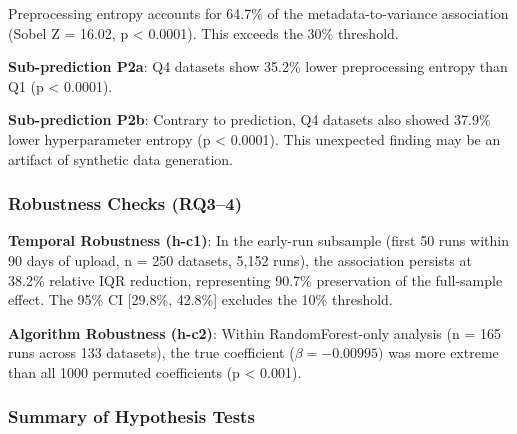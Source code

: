 \begin{table}[htbp]
\centering
{}
\end{table}

Preprocessing entropy accounts for 64.7\% of the metadata-to-variance association (Sobel Z = 16.02, p < 0.0001). This exceeds the 30\% threshold.

\textbf{Sub-prediction P2a}: Q4 datasets show 35.2\% lower preprocessing entropy than Q1 (p < 0.0001).

\textbf{Sub-prediction P2b}: Contrary to prediction, Q4 datasets also showed 37.9\% lower hyperparameter entropy (p < 0.0001). This unexpected finding may be an artifact of synthetic data generation.

\subsubsection{Robustness Checks (RQ3--4)}

\textbf{Temporal Robustness (h-c1)}: In the early-run subsample (first 50 runs within 90 days of upload, n = 250 datasets, 5,152 runs), the association persists at 38.2\% relative IQR reduction, representing 90.7\% preservation of the full-sample effect. The 95\% CI [29.8\%, 42.8\%] excludes the 10\% threshold.

\textbf{Algorithm Robustness (h-c2)}: Within RandomForest-only analysis (n = 165 runs across 133 datasets), the true coefficient ($\beta = -0.00995)$ was more extreme than all 1000 permuted coefficients (p < 0.001).

\subsubsection{Summary of Hypothesis Tests}

